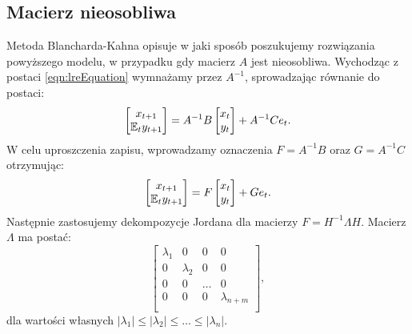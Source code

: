 \subsection{Macierz nieosobliwa}
\label{sec:bk_nieosobliwa}

Metoda Blancharda-Kahna opisuje w jaki sposób poszukujemy rozwiązania powyższego modelu, w przypadku gdy macierz $A$ jest nieosobliwa. Wychodząc z postaci \eqref{eqn:lreEquation} wymnażamy przez $A^{-1}$, sprowadzając równanie do postaci:
\begin{equation}
    \begin{bmatrix}
    x_{t+1} \\
    \mathbb{E}_t y_{t+1}
\end{bmatrix} = A^{-1}B \begin{bmatrix}
    x_{t} \\
    y_{t}
\end{bmatrix} + A^{-1} C e_t.
\end{equation}
W celu uproszczenia zapisu, wprowadzamy oznaczenia $F = A^{-1} B$ oraz $G = A^{-1} C$ otrzymując:
\begin{equation}
    \label{eqn:bkFG}
    \begin{bmatrix}
    x_{t+1} \\
    \mathbb{E}_t y_{t+1}
\end{bmatrix} = F \begin{bmatrix}
    x_{t} \\
    y_{t}
\end{bmatrix} + G e_t.
\end{equation}
Następnie zastosujemy dekompozycje Jordana dla macierzy $F = H^{-1} \Lambda H$. Macierz $\Lambda$ ma postać:
\begin{equation}
    \begin{bmatrix}
        \lambda_1 & 0 & 0 & 0 \\
        0 & \lambda_2 & 0 & 0 \\
        0 & 0 & \dots & 0 \\
        0 & 0 & 0 & \lambda_{n+m} \\
    \end{bmatrix},
\end{equation}
dla wartości własnych $ |\lambda_1| \leq |\lambda_2| \leq \dots \leq |\lambda_n|$.


